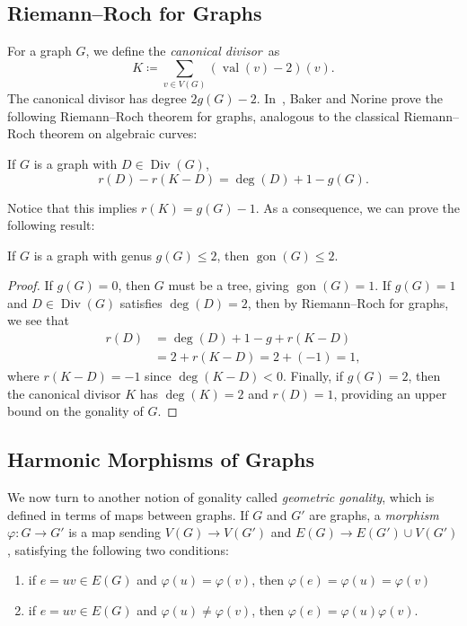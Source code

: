 \documentclass[ALCO,ThmDefs,Unicode,epreuves]{cedram}
\DeclareMathOperator{\gon}{gon}
\DeclareMathOperator{\val}{val}
\DeclareMathOperator{\Div}{Div}
\begin{document}
\subsection{Riemann--Roch for Graphs}

For a graph $G$, we define the \emph{canonical divisor}~as
\[
K \coloneqq \sum_{v \in V(G)} (\val (v) - 2) (v).
\]
The canonical divisor has degree $2g(G) - 2$. In~\cite{bn}, Baker and Norine prove the following Riemann--Roch theorem for graphs, analogous to the classical Riemann--Roch theorem on algebraic curves:

\begin{theorem}
\label{thm:riemannroch}
If $G$ is a graph with $D \in \Div (G)$, 
\[
r(D) - r(K-D) = \deg (D) + 1 - g(G).
\]
\end{theorem}

Notice that this implies $r(K) = g(G) - 1$. As a consequence, we can prove the following result:

\begin{prop}
\label{prop:genus2}
If $G$ is a graph with genus $g(G) \leq 2$, then $\gon (G) \leq 2$.
\end{prop}

\begin{proof}
If $g(G) = 0$, then $G$ must be a tree, giving $\gon (G) = 1$. If $g(G) = 1$ and $D \in \Div (G)$ satisfies $\deg (D) = 2$, then by Riemann--Roch for graphs, we see that
\begin{align*}
 r(D) &= \deg (D) + 1 - g + r(K - D) \\
 &= 2 + r(K - D) = 2+(-1)=1,
\end{align*}
where $r(K-D)=-1$ since $\deg(K-D)<0$.
Finally, if $g(G) = 2$, then the canonical divisor $K$ has $\deg (K) = 2$ and $r(D) = 1$, providing an upper bound on the gonality of $G$.
\end{proof}

\subsection{Harmonic Morphisms of Graphs}

We now turn to another notion of gonality called \emph{geometric gonality}, which is defined in terms of maps between graphs. If $G$ and $G'$ are graphs, a \emph{morphism} $\varphi : G \to G'$ is a map sending $V(G) \to V(G')$ and $E(G) \to E(G') \cup V(G')$, satisfying the following two conditions:

\begin{enumerate}
 \item\label{Sect2.4_1} if $e = uv \in E(G)$ and $\varphi(u) = \varphi(v)$, then $\varphi(e) = \varphi(u) = \varphi(v)$
 \item\label{Sect2.4_2} if $e = uv \in E(G)$ and $\varphi(u) \neq \varphi(v)$, then $\varphi(e) = \varphi(u)\varphi(v)$.
\end{enumerate}
\end{document}
